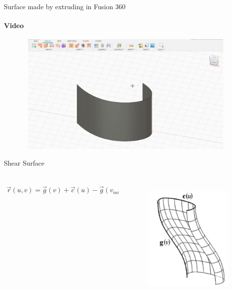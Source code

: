 \documentclass[aspectratio=169]{beamer}
\begin{document}
\begin{frame}[t]{Surface made by extruding in Fusion 360}
    \framesubtitle{Video}
    \vspace{-0.6cm}
    \begin{figure}[H]
        \href{run:./videos/extruding_surface_video.mp4}{
            \centering\includegraphics[height=6cm,width=1\textwidth,keepaspectratio]{extruding_surface_video_preview.jpg}}
    \end{figure}
\end{frame}

\begin{frame}[t]{Shear Surface}
\framesubtitle{}
    \begin{columns}[T,onlytextwidth]
        \begin{column}{0.49\textwidth}
            \begin{align*}
                \vec{r}(u,v) = \vec{g}(v) + \vec{c}(u) - \vec{g}(v_{min})
            \end{align*}
        \end{column}
        \begin{column}{0.49\textwidth}
            \vspace{-0.5cm}
            \begin{figure}[H]
                \centering\includegraphics[height=6cm,width=1\textwidth,keepaspectratio]{shear_surface_book.png}
                \label{fig:shear_surface_book.png}
            \end{figure}
        \end{column}
    \end{columns}
\end{frame}
\end{document}
